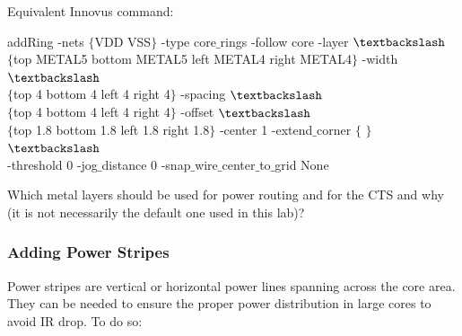 Equivalent Innovus command:
\begin{codeline}
addRing -nets $\{$VDD VSS$\}$ -type core$\_$rings -follow core -layer $\textbackslash$ \\$\{$top METAL5 bottom METAL5 left METAL4 right METAL4$\}$ -width $\textbackslash$ \\$\{$top 4 bottom 4 left 4 right 4$\}$ -spacing $\textbackslash$ \\$\{$top 4 bottom 4 left 4 right 4$\}$ -offset $\textbackslash$ \\$\{$top 1.8 bottom 1.8 left 1.8 right 1.8$\}$ -center 1 -extend$\_$corner $\{$ $\}$$\textbackslash$ \\ -threshold 0 -jog$\_$distance 0 -snap$\_$wire$\_$center$\_$to$\_$grid None
\end{codeline}

\begin{exercise}
Which metal layers should be used for power routing and for the CTS and why (it is not necessarily the default one used in this lab)?
\end{exercise}



\subsubsection{Adding Power Stripes}
Power stripes are vertical or horizontal power lines spanning across the core area. They can be needed to ensure the proper power distribution in large cores to avoid IR drop. To do so:


